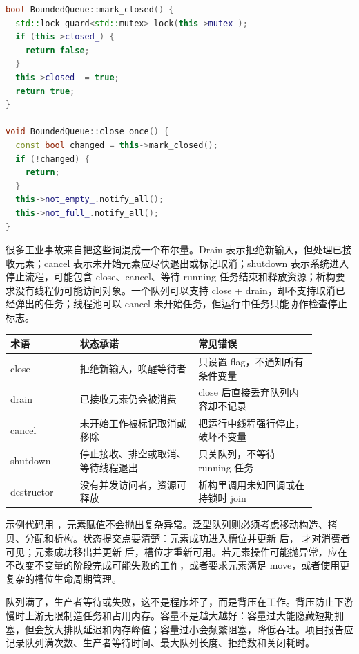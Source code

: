 \begin{lstlisting}[language=C++,caption={只在第一次关闭时广播，语义仍保持幂等}]
bool BoundedQueue::mark_closed() {
  std::lock_guard<std::mutex> lock(this->mutex_);
  if (this->closed_) {
    return false;
  }
  this->closed_ = true;
  return true;
}

void BoundedQueue::close_once() {
  const bool changed = this->mark_closed();
  if (!changed) {
    return;
  }
  this->not_empty_.notify_all();
  this->not_full_.notify_all();
}
\end{lstlisting}

很多工业事故来自把这些词混成一个布尔量。Drain 表示拒绝新输入，但处理已接收元素；cancel 表示未开始元素应尽快退出或标记取消；shutdown 表示系统进入停止流程，可能包含 close、cancel、等待 running 任务结束和释放资源；析构要求没有线程仍可能访问对象。一个队列可以支持 close + drain，却不支持取消已经弹出的任务；线程池可以 cancel 未开始任务，但运行中任务只能协作检查停止标志。

\begin{center}
\begin{tabular}{p{0.20\linewidth}p{0.34\linewidth}p{0.34\linewidth}}
\toprule
术语 & 状态承诺 & 常见错误 \\
\midrule
close & 拒绝新输入，唤醒等待者 & 只设置 flag，不通知所有条件变量 \\
drain & 已接收元素仍会被消费 & close 后直接丢弃队列内容却不记录 \\
cancel & 未开始工作被标记取消或移除 & 把运行中线程强行停止，破坏不变量 \\
shutdown & 停止接收、排空或取消、等待线程退出 & 只关队列，不等待 running 任务 \\
destructor & 没有并发访问者，资源可释放 & 析构里调用未知回调或在持锁时 join \\
\bottomrule
\end{tabular}
\end{center}

示例代码用 ，元素赋值不会抛出复杂异常。泛型队列则必须考虑移动构造、拷贝、分配和析构。状态提交点要清楚：元素成功进入槽位并更新  后， 才对消费者可见；元素成功移出并更新  后，槽位才重新可用。若元素操作可能抛异常，应在不改变不变量的阶段完成可能失败的工作，或者要求元素满足  move，或者使用更复杂的槽位生命周期管理。

队列满了，生产者等待或失败，这不是程序坏了，而是背压在工作。背压防止下游慢时上游无限制造任务和占用内存。容量不是越大越好：容量过大能隐藏短期拥塞，但会放大排队延迟和内存峰值；容量过小会频繁阻塞，降低吞吐。项目报告应记录队列满次数、生产者等待时间、最大队列长度、拒绝数和关闭耗时。

